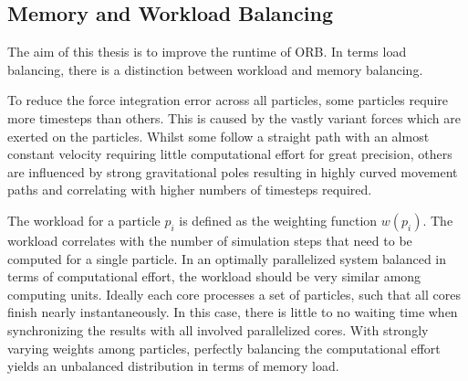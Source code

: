 \documentclass[]{article}
\begin{document}
\subsection{Memory and Workload Balancing}\label{balancing}
The aim of this thesis is to improve the runtime of ORB. In terms load balancing, there is a distinction between workload and memory balancing. 

To reduce the force integration error across all particles, some particles require more timesteps than others. This is caused by the vastly variant forces which are exerted on the particles. Whilst some follow a straight path with an almost constant velocity requiring little computational effort for great precision, others are influenced by strong gravitational poles resulting in highly curved movement paths and correlating with higher numbers of timesteps required.

The workload for a particle $p_i$ is defined as the weighting function $w(p_i)$. The workload correlates with the number of simulation steps that need to be computed for a single particle. In an optimally parallelized system balanced in terms of computational effort, the workload should be very similar among computing units. Ideally each core processes a set of particles, such that all cores finish nearly instantaneously. In this case, there is little to no waiting time when synchronizing the results with all involved parallelized cores. With strongly varying weights among particles, perfectly balancing the computational effort yields an unbalanced distribution in terms of memory load.

\begin{comment}
Lets consider a simple example to illustrate the point. Given the set of particles $A = \{p_1, p_2, .., p_{2m/3}\}$ and respectively $B = \{p_{2m/3 + 1}, p_2, .., p_{m}\}$. This yields a total number of particles equivalent to $N = m$. Assuming that $\forall p \in A : w(p) = 1$ and $\forall p \in B : w(p) = 2$. 
All particles from set $A$ are assigned to processor rank 0 and the particles from B to rank 1. It follows $\sum_{p\in A} w(p) = \sum_{p\in B} w(p)$. Thus the two processors are balanced in terms of computing costs, but not in terms of memory size. In fact, process with rank 0 has $2m/3$ elements and rank 1 has $m/3$ elements. Assuming each process has a memory size of $2m/3$, then clearly this configuration is not optimal. When favoring memory balancing, $2m/3$ could be assigned to each processor and $(4/3) \times m$ as many particles could be processed in total, which is larger than the original $N$ and therefore favorable.
\end{comment}
\end{document}
